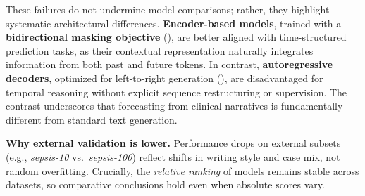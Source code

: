 These failures do not undermine model comparisons; rather, they highlight systematic architectural differences. \textbf{Encoder-based models}, trained with a \textbf{bidirectional masking objective} (\cite{devlin2019bert}), are better aligned with time-structured prediction tasks, as their contextual representation naturally integrates information from both past and future tokens.
In contrast, \textbf{autoregressive decoders}, optimized for left-to-right generation (\cite{brown2020language}), are disadvantaged for temporal reasoning without explicit sequence restructuring or supervision.
The contrast underscores that forecasting from clinical narratives is fundamentally different from standard text generation.
 
 \textbf{Why external validation is lower.} Performance drops on external subsets (e.g., \textit{sepsis-10} vs.\ \textit{sepsis-100}) reflect shifts in writing style and case mix, not random overfitting. Crucially, the \emph{relative ranking} of models remains stable across datasets, so comparative conclusions hold even when absolute scores vary.



